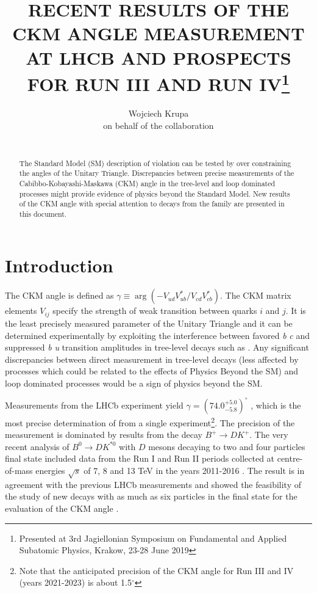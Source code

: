 \documentclass{appolb}
\begin{document}
\title{RECENT RESULTS OF THE CKM ANGLE \g MEASUREMENT AT LHCB AND PROSPECTS FOR RUN III AND RUN IV\footnote{Presented at 3rd Jagiellonian Symposium on Fundamental and Applied Subatomic Physics, Krakow, 23-28 June 2019} }
\author{Wojciech Krupa \\ on behalf of the \lhcb collaboration 
\address{AGH University of Science and Technology \\Faculty of Physics and Applied Computer Science \\ al. Mickiewicza 30, 30-059 Krakow, Poland}
\\
}
\maketitle
\begin{abstract}
The Standard Model (SM) description of \CP violation can be tested by over constraining the angles of the Unitary Triangle. Discrepancies between precise measurements of the Cabibbo-Kobayashi-Maskawa (CKM) angle \g in the tree-level and loop dominated processes might provide evidence of physics beyond the Standard Model. New results of the CKM angle \g with special attention to decays from the  family are presented in this document.

\end{abstract}

\section{Introduction}
The CKM angle \g is defined as $\gamma \equiv \arg(-V_{ud}V_{ub}^{*}/V_{cd}V_{cb}^{*})$.  The CKM matrix elements $V_{ij}$ specify the strength of weak transition between quarks $i$ and $j$. It is the least precisely measured parameter of the Unitary Triangle and it can be determined experimentally by exploiting the interference between favored \textit{b} \to \textit{c} and suppressed \textit{b} \to \textit{u} transition amplitudes in tree-level decays such as . Any significant discrepancies between direct measurement in tree-level decays (less affected by processes which could be related to the effects of Physics Beyond the SM) and loop dominated processes would be a sign of physics beyond the SM.  

Measurements from the LHCb experiment yield $\gamma=(74.0^{+5.0}_{-5.8})^\circ$ \cite{gamma_B2DK, gamma_comb}, which is the most precise determination of \g from a single experiment\footnote{Note that the anticipated precision of the CKM angle \g for Run III and IV (years 2021-2023) is about 1.5$^\circ$\cite{lhcb_phys_case}}. The precision of the measurement is dominated by results from the decay $B^+\rightarrow D K^+$. The very recent analysis of $B^0\rightarrow D K^{*0}$ with $D$ mesons decaying to two and four particles final state included data from the Run I and Run II periods collected at centre-of-mass energies $\sqrt s$ of 7, 8 and 13 TeV in the years 2011-2016 \cite{B2Dkstar0}. The result is in agreement with the previous LHCb measurements and showed the feasibility of the study of new decays with as much as six particles in the final state for the evaluation of the CKM angle \g.  
\end{document}
